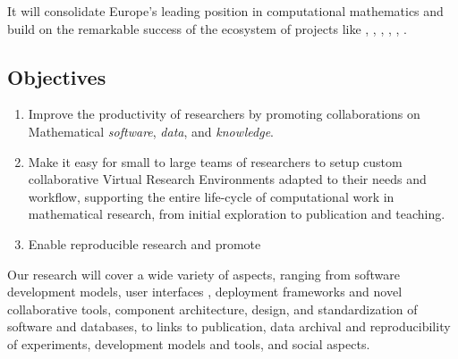 \documentclass[a4paper,11pt]{article}
\begin{document}
It will consolidate Europe's leading position in computational
mathematics and build on the remarkable success of the ecosystem of
projects like \GAP, \Python, \Sage, \Pari, \Singular, \LMFDB.



\subsection{Objectives}
\label{sect:objectives}





\begin{enumerate}
\item \label{aim:collaboration} Improve the productivity of
  researchers by promoting collaborations on Mathematical
  \emph{software}, \emph{data}, and \emph{knowledge}.
\item \label{aim:vre} Make it easy for small to large teams of
  researchers to setup custom collaborative Virtual Research
  Environments adapted to their needs and workflow, supporting the
  entire life-cycle of computational work in mathematical research,
  from initial exploration to publication and teaching.
\item \label{aim:sharing} Enable reproducible research and promote
\end{enumerate}



Our research will cover a wide variety of aspects, ranging from
software development models, user interfaces , deployment frameworks and novel collaborative tools,
component architecture, design, and standardization of software
 and databases, to links to publication, data archival
and reproducibility of experiments, development models and tools, and
social aspects.
\end{document}
